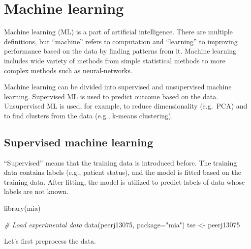 \documentclass[
]{book}
\newenvironment{Shaded}{\begin{snugshade}}{\end{snugshade}}
\newcommand{\AttributeTok}[1]{\textcolor[rgb]{0.77,0.63,0.00}{#1}}
\newcommand{\CommentTok}[1]{\textcolor[rgb]{0.56,0.35,0.01}{\textit{#1}}}
\newcommand{\FunctionTok}[1]{\textcolor[rgb]{0.00,0.00,0.00}{#1}}
\newcommand{\NormalTok}[1]{#1}
\newcommand{\OtherTok}[1]{\textcolor[rgb]{0.56,0.35,0.01}{#1}}
\newcommand{\StringTok}[1]{\textcolor[rgb]{0.31,0.60,0.02}{#1}}
\begin{document}
\hypertarget{machine_learning}{%
\chapter{Machine learning}\label{machine_learning}}

Machine learning (ML) is a part of artificial intelligence. There are multiple
definitions, but ``machine'' refers to computation and ``learning'' to improving
performance based on the data by finding patterns from it. Machine learning
includes wide variety of methods from simple statistical methods to more
complex methods such as neural-networks.

Machine learning can be divided into supervised and unsupervised machine learning.
Supervised ML is used to predict outcome based on the data. Unsupervised ML is used,
for example, to reduce dimensionality (e.g.~PCA) and to find clusters from the
data (e.g., k-means clustering).

\hypertarget{supervised-machine-learning}{%
\section{Supervised machine learning}\label{supervised-machine-learning}}

``Supervised'' means that the training data is introduced before. The training data
contains labels (e.g., patient status), and the model is fitted based on the
training data. After fitting, the model is utilized to predict labels of data whose
labels are not known.

\begin{Shaded}
\begin{Highlighting}[]
\FunctionTok{library}\NormalTok{(mia)}

\CommentTok{\# Load experimental data}
\FunctionTok{data}\NormalTok{(peerj13075, }\AttributeTok{package=}\StringTok{"mia"}\NormalTok{)}
\NormalTok{tse }\OtherTok{\textless{}{-}}\NormalTok{ peerj13075}
\end{Highlighting}
\end{Shaded}

Let's first preprocess the data.
\end{document}
